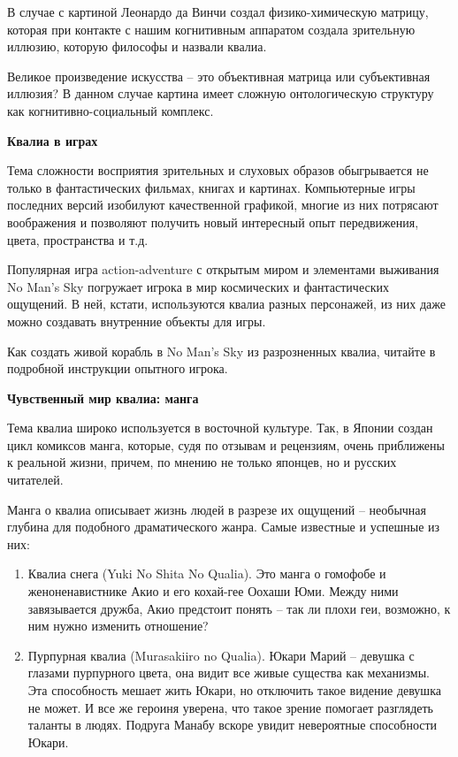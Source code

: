 В случае с картиной Леонардо да Винчи создал физико-химическую матрицу, которая при контакте с нашим когнитивным аппаратом создала зрительную иллюзию, которую философы и назвали квалиа.

Великое произведение искусства – это объективная матрица или субъективная иллюзия? В данном случае картина имеет сложную онтологическую структуру как когнитивно-социальный комплекс.

\textbf{Квалиа в играх}

Тема сложности восприятия зрительных и слуховых образов обыгрывается не только в фантастических фильмах, книгах и картинах. Компьютерные игры последних версий изобилуют качественной графикой, многие из них потрясают воображения и позволяют получить новый интересный опыт передвижения, цвета, пространства и т.д.

Популярная игра action-adventure с открытым миром и элементами выживания No Man’s Sky погружает игрока в мир космических и фантастических ощущений. В ней, кстати, используются квалиа разных персонажей, из них даже можно создавать внутренние объекты для игры.

Как создать живой корабль в No Man’s Sky из разрозненных квалиа, читайте в подробной инструкции опытного игрока.

\textbf{Чувственный мир квалиа: манга}

Тема квалиа широко используется в восточной культуре. Так, в Японии создан цикл комиксов манга, которые, судя по отзывам и рецензиям, очень приближены к реальной жизни, причем, по мнению не только японцев, но и русских читателей.

Манга о квалиа описывает жизнь людей в разрезе их ощущений – необычная глубина для подобного драматического жанра. Самые известные и успешные из них:

\begin{enumerate}
    \item Квалиа снега (Yuki No Shita No Qualia). Это манга о гомофобе и женоненавистнике Акио и его кохай-гее Оохаши Юми. Между ними завязывается дружба, Акио предстоит понять – так ли плохи геи, возможно, к ним нужно изменить отношение?
    \item Пурпурная квалиа (Murasakiiro no Qualia). Юкари Марий – девушка с глазами пурпурного цвета, она видит все живые существа как механизмы. Эта способность мешает жить Юкари, но отключить такое видение девушка не может. И все же героиня уверена, что такое зрение помогает разглядеть таланты в людях. Подруга Манабу вскоре увидит невероятные способности Юкари.
\end{enumerate}

